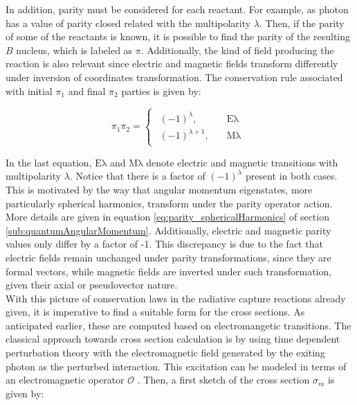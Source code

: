\documentclass[openany]{book}
\begin{document}
In addition, parity must be considered for each reactant. For example, as photon has a value of parity closed related with the multipolarity $\lambda$. Then, if the parity of some of the reactants is known, it is possible to find the parity of the resulting $B$ nucleus, which is labeled as $\pi$.  Additionally, the kind of field producing the reaction is also relevant since electric and magnetic fields transform differently under inversion of coordinates transformation. The conservation rule associated with initial $\pi_1$ and final $\pi_2$ parties is given by:  

\begin{equation} \label{eq:radiativeCapture_parity}
	\pi_1 \pi_2 = 	\left\{\begin{array}{l}
		\begin{split}
			(-1)^{\lambda}, \quad & \mathrm{E\lambda} \\ 
			(-1)^{\lambda + 1}, \quad & \mathrm{M\lambda}
		\end{split}
	\end{array}\right.
\end{equation}

In the last equation, $\mathrm{E\lambda}$ and $\mathrm{M\lambda}$ denote electric and magnetic transitions with multipolarity $\lambda$.  Notice that there is a factor of $(-1)^\lambda$ present in both cases. This is motivated by the way that angular momentum eigenstates, more particularly spherical harmonics, transform under the parity operator action. More details are given in equation \ref{eq:parity_sphericalHarmonics} of section \ref{sub:quantumAngularMomentum}. Additionally, electric and magnetic parity values only differ by a factor of -1. This discrepancy is due to the fact that electric fields remain unchanged under parity transformations, since they are formal vectors, while magnetic fields are inverted under such transformation, given their axial or pseudovector nature.   \\

With this picture of conservation laws in the radiative capture reactions already given, it is imperative to find a suitable form for the cross sections. As anticipated earlier, these are computed based on electromangetic transitions. The classical approach towards cross section calculation is by using time dependent perturbation theory with the electromagnetic field generated by the exiting photon as the perturbed interaction. This excitation can be modeled in terms of an electromagnetic operator $\mathcal{O}$ \cite{huang_bertulani_guimaraes_2010}. Then, a first sketch of the cross section $\sigma_m$ is given by: 
\end{document}
